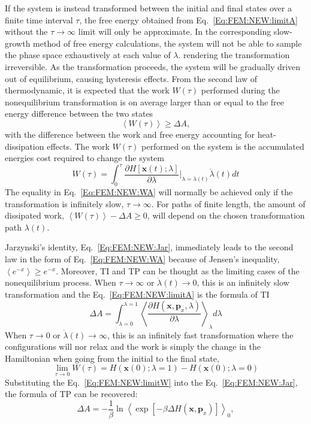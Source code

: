 If the system is instead transformed between the initial and final states over a finite time interval $\tau$, the free energy obtained from Eq.~\ref{Eq:FEM:NEW:limitA} without the $\tau\to\infty$ limit will only be approximate. In the corresponding slow-growth method of free energy calculations, the system will not be able to sample the phase space exhaustively at each value of $\lambda$. rendering the transformation irreversible. As the transformation proceeds, the system will be gradually driven out of equilibrium, causing hysteresis effects. From the second law of thermodynamic, it is expected that the work $W(\tau)$ performed during the nonequilibrium transformation is on average larger than or equal to the free energy difference between the two states
\begin{equation}
\left \langle W(\tau) \right \rangle \ge \Delta A,
\label{Eq:FEM:NEW:WA}
\end{equation} 
with the difference between the work and free energy accounting for heat-dissipation effects. The work $W(\tau)$ performed on the system is the accumulated energies cost required to change the system
\begin{equation}
W(\tau) = \int_{0}^{\tau} \frac{\partial{H[\textbf{x}(t);\lambda]}}{\partial{\lambda}}\bigg\rvert_{\lambda=\lambda(t)} \dot{\lambda}(t) dt
\label{Eq:FEM:NEW:work}
\end{equation}    
The equality in Eq.~\ref{Eq:FEM:NEW:WA} will normally be achieved only if the transformation is infinitely slow, $\tau\to\infty$.  For paths of finite length, the amount of dissipated work, $\left \langle W(\tau) \right \rangle - \Delta A \ge 0$, will depend on the chosen transformation path $\lambda(t)$.

Jarzynski's identity, Eq.~\ref{Eq:FEM:NEW:Jar}, immediately leads to the second law in the form of Eq.~\ref{Eq:FEM:NEW:WA} because of Jensen's inequality, $\left \langle e^{-x} \right \rangle \ge e^{-x} $.
Moreover, TI and TP can be thought as the limiting cases of the nonequilibrium process. When $\tau\to\infty$ or $\dot{\lambda}(t)\to0$, this is an infinitely slow transformation and the Eq.~\ref{Eq:FEM:NEW:limitA} is the formula of TI
\begin{equation}
\Delta A = \int_{\lambda=0}^{\lambda=1}\left \langle \frac{\partial{H(\textbf{x},\textbf{p}_{x},\lambda)}}{\partial{\lambda}} \right \rangle_{\lambda} d\lambda
\label{Eq:FEM:NEW:TINEW}
\end{equation}  
When $\tau\to0$ or $\dot{\lambda}(t)\to\infty$, this is an infinitely fast transformation where the configurations will nor relax and the work is simply the change in the Hamiltonian when going from the initial to the final state,
\begin{equation}
\lim_{\tau\to0}W(\tau) = H(\textbf{x}(0);\lambda=1)-H(\textbf{x}(0);\lambda=0)
\label{Eq:FEM:NEW:limitW}
\end{equation}
Substituting the Eq.~\ref{Eq:FEM:NEW:limitW} into the Eq.~\ref{Eq:FEM:NEW:Jar}, the formula of TP can be recovered:
\begin{equation}
\Delta A = -\frac{1}{\beta} \ln \left \langle \exp[-\beta \Delta H(\textbf{x},\textbf{p}_{x})] \right \rangle  _{0},
\label{Eq:FEM:NEW:deltaA4NEW}
\end{equation}

